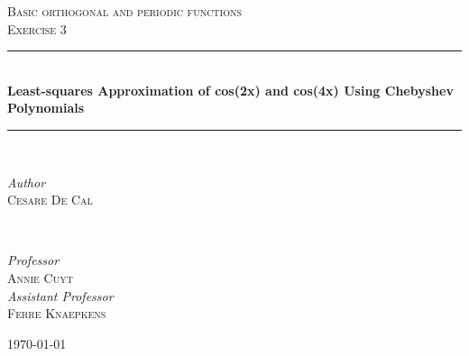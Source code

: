 \documentclass{article}
\begin{document}

\begin{titlepage} %
	\newcommand{\HRule}{\rule{\linewidth}{0.5mm}}%
	
	\center %
	
	
	\textsc{\Large Basic orthogonal and periodic functions}\\[0.5cm] %
	
	\textsc{\large Exercise 3}\\[0.5cm] %
	
	
	\HRule\\[0.6cm]
	
	{\huge\bfseries Least-squares Approximation of cos(2x) and cos(4x) Using Chebyshev Polynomials}\\[0.25cm] %
	
	\HRule\\[1.5cm]
	
	
	\begin{minipage}{0.4\textwidth}
		\begin{flushleft}
			\large
			\textit{Author}\\
			\textsc{Cesare De Cal} %
		\end{flushleft}
	\end{minipage}
	~
	\begin{minipage}{0.4\textwidth}
		\begin{flushright}
			\large
			\textit{Professor}\\
			\textsc{Annie Cuyt}\\ %
			[0.25cm]
			\textit{Assistant Professor}\\
			\textsc{Ferre Knaepkens} %

		\end{flushright}
	\end{minipage}
		
	\vfill\vfill\vfill
	
	{\large\today}
		
	\vfill
	
\end{titlepage}
\end{document}
